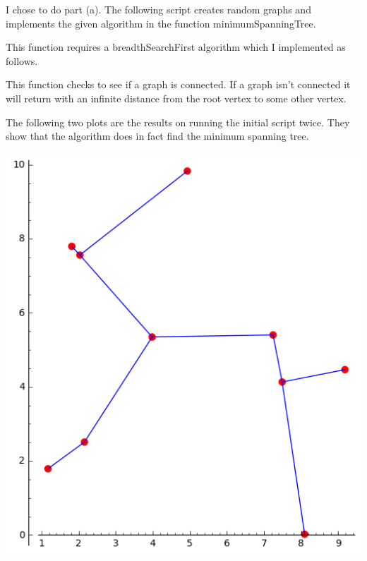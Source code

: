 \documentclass[11pt, oneside]{article}
\begin{document}
\begin{enumerate}
    I chose to do part (a).
    The following script creates random graphs and implements the given
    algorithm in the function minimumSpanningTree.
    
    This function requires a breadthSearchFirst algorithm which I implemented
    as follows.
    
    This function checks to see if a graph is connected.
    If a graph isn't connected it will return with an infinite
    distance from the root vertex to some other vertex.

    The following two plots are the results on running the initial script twice.
    They show that the algorithm does in fact find the minimum spanning tree.
    \begin{center}
      \includegraphics[scale=.6]{Figures/midterm_1.png} \\

\end{center}
\end{enumerate}
\end{document}

